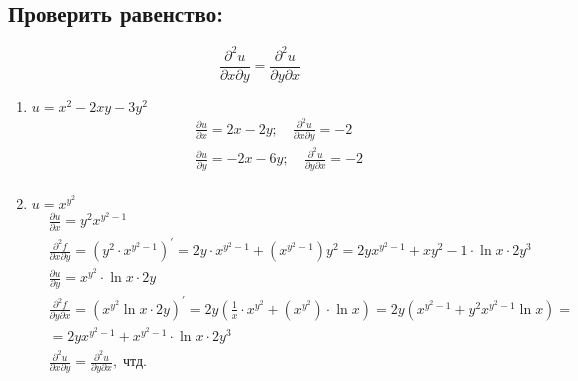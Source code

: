 \documentclass[a4paper, 12pt]{article}
\begin{document}
\subsection{Проверить равенство:}
$$\frac{\partial^2 u}{\partial x \partial y} = \frac{\partial^2 u}{\partial y \partial x}$$
\begin{enumerate}
  \item %
$u = x^2 - 2xy - 3y^2$  \\
\begin{align*}
    &\frac{\partial u}{\partial x} = 2x - 2y; \quad
    \frac{\partial^2 u}{\partial x \partial y} = -2 \\
    \
    &\frac{\partial u}{\partial y} = -2x - 6y;\quad
    \frac{\partial^2 u}{\partial y \partial x} = -2 \\
\end{align*}
  \item %
  $u = x^{y^{2}}$ \\
  \begin{align*}
&\boxed{\frac{\partial u}{\partial x}} = \boxed{y^2 x^{y^2-1}} \\
&\boxed{\frac{\partial^2 f}{\partial x \partial y}} = (y^2\cdot x^{y^2-1})^{'} = 2y \cdot x^{y^2-1} + (x^{y^2-1}) y^2 = \boxed{2yx^{y^2-1} + x{y^2-1}\cdot \ln x \cdot 2y^3} \\
&\boxed{\frac{\partial u}{\partial y}} = \boxed{x^{y^2} \cdot \ln x \cdot 2y} \\
&\boxed{\frac{\partial^2 f}{\partial y \partial x}} = (x^{y^2}\ln x \cdot 2y)^{'} = 2y (\frac{1}{x} \cdot x^{y^2} + (x^{y^2})\cdot \ln x) = 2y (x^{y^2-1} + y^2x^{y^2-1}\ln x) = \\
&=\boxed{2yx^{y^2-1}+x^{y^2-1} \cdot \ln x \cdot 2y^3} \\
&\frac{\partial^2u}{\partial x \partial y} = \frac{\partial^2 u}{\partial y \partial x}, \; \text{чтд.}
  \end{align*}
  

\end{enumerate}
\end{document}
